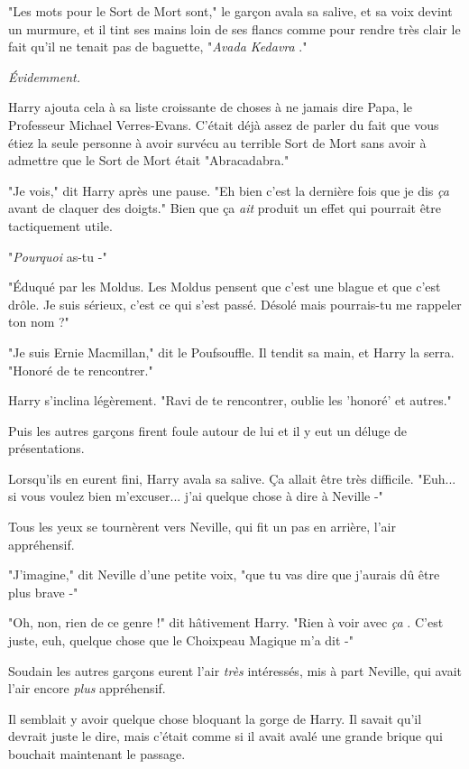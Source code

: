 "Les mots pour le Sort de Mort sont," le garçon avala sa salive, et sa voix devint un murmure, et il tint ses mains loin de ses flancs comme pour rendre très clair le fait qu'il ne tenait pas de baguette, "\emph{Avada Kedavra} ."

\emph{Évidemment.} 

Harry ajouta cela à sa liste croissante de choses à ne jamais dire Papa, le Professeur Michael Verres-Evans. C'était déjà assez de parler du fait que vous étiez la seule personne à avoir survécu au terrible Sort de Mort sans avoir à admettre que le Sort de Mort était "Abracadabra."

"Je vois," dit Harry après une pause. "Eh bien c'est la dernière fois que je dis \emph{ça}  avant de claquer des doigts." Bien que ça \emph{ait}  produit un effet qui pourrait être tactiquement utile.

"\emph{Pourquoi}  as-tu -"

"Éduqué par les Moldus. Les Moldus pensent que c'est une blague et que c'est drôle. Je suis sérieux, c'est ce qui s'est passé. Désolé mais pourrais-tu me rappeler ton nom ?"

"Je suis Ernie Macmillan," dit le Poufsouffle. Il tendit sa main, et Harry la serra. "Honoré de te rencontrer."

Harry s'inclina légèrement. "Ravi de te rencontrer, oublie les 'honoré' et autres."

Puis les autres garçons firent foule autour de lui et il y eut un déluge de présentations.

Lorsqu'ils en eurent fini, Harry avala sa salive. Ça allait être très difficile. "Euh... si vous voulez bien m'excuser... j'ai quelque chose à dire à Neville -"

Tous les yeux se tournèrent vers Neville, qui fit un pas en arrière, l'air appréhensif.

"J'imagine," dit Neville d'une petite voix, "que tu vas dire que j'aurais dû être plus brave -"

"Oh, non, rien de ce genre !" dit hâtivement Harry. "Rien à voir avec \emph{ça} . C'est juste, euh, quelque chose que le Choixpeau Magique m'a dit -"

Soudain les autres garçons eurent l'air \emph{très}  intéressés, mis à part Neville, qui avait l'air encore \emph{plus}  appréhensif.

Il semblait y avoir quelque chose bloquant la gorge de Harry. Il savait qu'il devrait juste le dire, mais c'était comme si il avait avalé une grande brique qui bouchait maintenant le passage.

